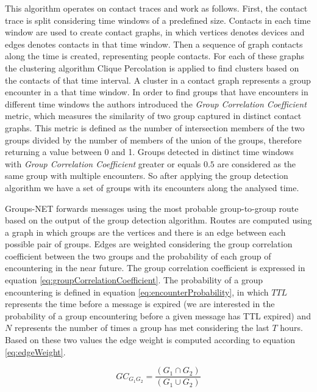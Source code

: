 This algorithm operates on contact traces and work as follows. First, the contact trace is split considering time windows of a predefined size. Contacts in each time window are used to create contact graphs, in which vertices denotes devices and edges denotes contacts in that time window. Then a sequence of graph contacts along the time is created, representing people contacts. For each of these graphs the clustering algorithm Clique Percolation \citep{derenyi2005clique} is applied to find clusters based on the contacts of that time interval. A cluster in a contact graph represents a group encounter in a that time window. In order to find groups that have encounters in different time windows the authors introduced the \textit{Group Correlation Coefficient} metric, which measures the similarity of two group captured in distinct contact graphs. This metric is defined as the number of intersection members of the two groups divided by the number of members of the union of the groups, therefore returning a value between 0 and 1. Groups detected in distinct time windows with \textit{Group Correlation Coefficient} greater or equals $0.5$ are considered as the same group with multiple encounters. So after applying the group detection algorithm we have a set of groups with its encounters along the analysed time.

Groups-NET forwards messages using the most probable group-to-group route based on the output of the group detection algorithm. Routes are computed using a graph in which groups are the vertices and there is an edge between each possible pair of groups. Edges are weighted considering the group correlation coefficient between the two groups and the probability of each group of encountering in the near future. The group correlation coefficient is expressed in equation \ref{eq:groupCorrelationCoefficient}. The probability of a group encountering is defined in equation \ref{eq:encounterProbability}, in which $TTL$ represents the time before a message is expired (we are interested in the probability of a group encountering before a given message has TTL expired) and $N$ represents the number of times a group has met considering the last $T$ hours. Based on these two values the edge weight is computed according to equation \ref{eq:edgeWeight}.

\begin{equation}
	\label{eq:groupCorrelationCoefficient}
	GC_{G_1G_2} = \frac{(G_1 \cap G_2)}{(G_1 \cup G_2)}
\end{equation}


